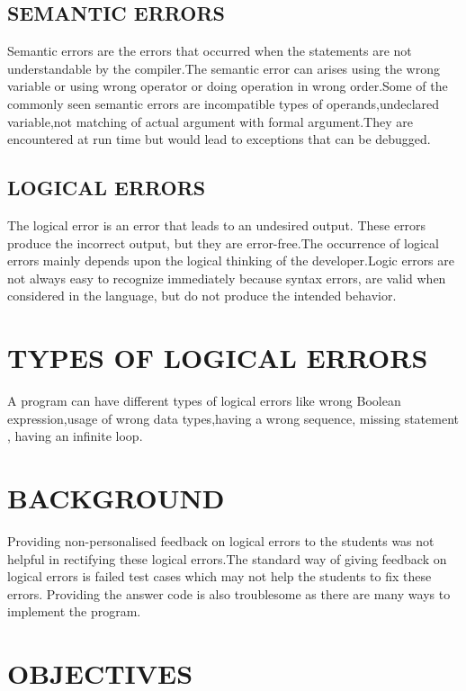\subsection{SEMANTIC ERRORS}

Semantic errors are the errors that occurred when the statements are not understandable by the compiler.The semantic error can arises using the wrong variable or using wrong operator or doing operation in wrong order.Some of the commonly seen semantic errors are incompatible types of operands,undeclared variable,not matching of actual argument with formal argument.They are encountered at run time \cite{bitesize_2022} but would lead to exceptions that can be debugged.
 
\subsection{LOGICAL ERRORS}
\justifying
The logical error is an error that leads to an undesired output. These errors produce the incorrect output\cite{bitesize_2022}, but they are error-free.The occurrence of logical errors mainly depends upon the logical thinking of the developer.Logic errors are not always easy to recognize immediately because syntax errors, are valid when considered in the language, but do not produce the intended behavior.

\section{\uppercase{TYPES OF LOGICAL ERRORS}}

A program can have different types of logical errors like wrong Boolean expression\cite{bitesize_2022},usage of wrong data types\cite{bitesize_2022},having a wrong sequence, missing statement , having an infinite loop.

\section{\uppercase{BACKGROUND}}
Providing non-personalised feedback on logical errors to the students was not helpful in rectifying these logical errors.The standard way of giving feedback on logical errors is failed test cases which may not help the students to fix these errors. Providing the answer code is also troublesome as there are many ways to implement the program. 

\section{\uppercase{OBJECTIVES}} 

